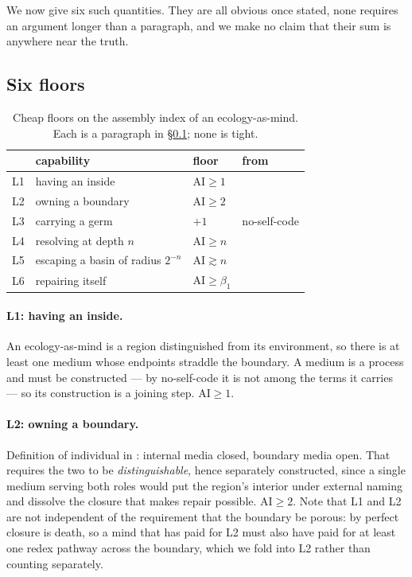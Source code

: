 \documentclass[11pt]{article}
\theoremstyle{plain}
\theoremstyle{definition}
\theoremstyle{remark}
\newcommand{\AI}{\mathrm{AI}}
\newcommand{\bt}{\beta_1}
\begin{document}
We now give six such quantities. They are all obvious once stated, none
requires an argument longer than a paragraph, and we make no claim that
their sum is anywhere near the truth.

\subsection{Six floors}\label{sco:S5.2}

\begin{table}[h]
\centering
\begin{tabular}{clll}
\toprule
 & capability & floor & from \\
\midrule
L1 & having an inside            & $\AI \ge 1$ & \cite[Def.~5.11]{engine} \\
L2 & owning a boundary           & $\AI \ge 2$ & \cite[Prop.~5.12]{engine} \\
L3 & carrying a germ             & $+1$        & no-self-code \\
L4 & resolving at depth $n$      & $\AI \ge n$ & \cite[Thm.~44.4]{book} \\
L5 & escaping a basin of radius $2^{-n}$ & $\AI \gtrsim n$ & \cite[Prop.~12]{scientist} \\
L6 & repairing itself            & $\AI \ge \bt$ & \cite[Thm.~6.3]{engine} \\
\bottomrule
\end{tabular}
\caption{Cheap floors on the assembly index of an ecology-as-mind. Each is
a paragraph in \S\ref{sco:S5.2}; none is tight.}
\label{sco:tab:floors}
\end{table}

\paragraph{L1: having an inside.}
An ecology-as-mind is a region distinguished from its environment, so
there is at least one medium whose endpoints straddle the boundary. A
medium is a process and must be constructed --- by no-self-code it is not
among the terms it carries --- so its construction is a joining step.
$\AI \ge 1$.

\paragraph{L2: owning a boundary.}
Definition of individual in \cite[\S5.5]{engine}: internal media closed,
boundary media open. That requires the two to be \emph{distinguishable},
hence separately constructed, since a single medium serving both roles
would put the region's interior under external naming and dissolve the
closure that makes repair possible. $\AI \ge 2$. Note that L1 and L2 are
not independent of the requirement that the boundary be porous: by
\cite[Prop.~5.14]{engine} perfect closure is death, so a mind that has
paid for L2 must also have paid for at least one redex pathway across the
boundary, which we fold into L2 rather than counting separately.
\end{document}
